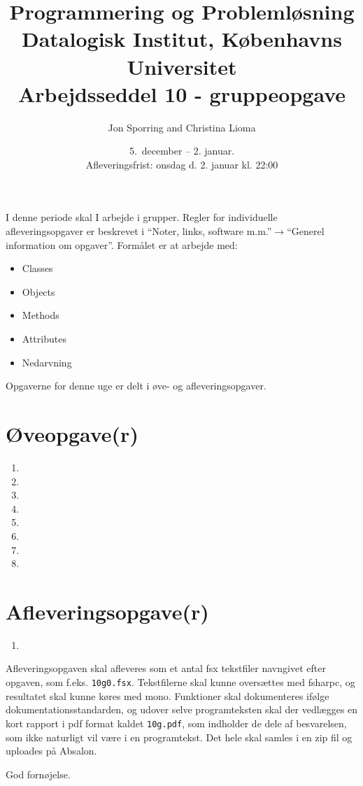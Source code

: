 \documentclass[a4paper,12pt]{article}
\title{Programmering og Problemløsning\\Datalogisk Institut,
  Københavns Universitet\\Arbejdsseddel 10 - gruppeopgave}
\author{Jon Sporring and Christina Lioma}
\date{5.\ december -- 2. januar.\\Afleveringsfrist: onsdag d. 2. januar kl. 22:00}
\begin{document}
\maketitle

I denne periode skal I arbejde i grupper. Regler for individuelle afleveringsopgaver er beskrevet i "`Noter, links, software m.m."'$\rightarrow$"`Generel information om opgaver"'. Formålet er at arbejde med:
\begin{itemize}
\item Classes
\item Objects
\item Methods
\item Attributes
\item Nedarvning
\end{itemize}

Opgaverne for denne uge er delt i øve- og afleveringsopgaver. 

\section*{Øveopgave(r)}
\begin{enumerate}[label=10ø.\arabic*,start=0]
\item 
\item 
\item 
\item 
\item 
\item 
\item 
\item 
\end{enumerate}

\section*{Afleveringsopgave(r)}

\begin{enumerate}[label=10g.\arabic*,start=0]
\item 
\end{enumerate}
 
Afleveringsopgaven skal afleveres som et antal fsx tekstfiler navngivet efter opgaven, som f.eks. \lstinline!10g0.fsx!. Tekstfilerne skal kunne oversættes med fsharpc, og resultatet skal kunne køres med mono. Funktioner skal dokumenteres ifølge dokumentationsstandarden, og udover selve programteksten skal der vedlægges en kort rapport i pdf format kaldet \lstinline{10g.pdf}, som indholder de dele af besvarelsen, som ikke naturligt vil være i en programtekst. Det hele skal samles i en zip fil og uploades på Absalon.

\flushright God fornøjelse.
\end{document}
